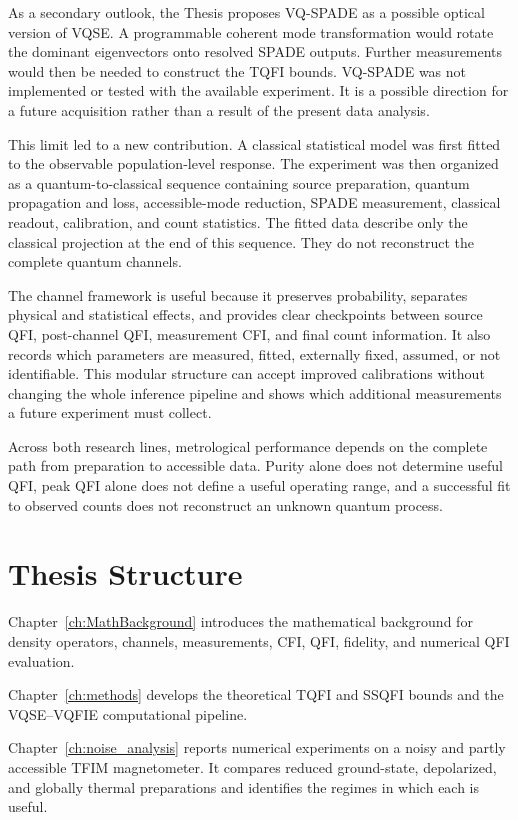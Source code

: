 As a secondary outlook, the Thesis proposes VQ-SPADE as a possible optical version of VQSE.  A programmable coherent mode transformation would rotate the dominant eigenvectors onto resolved SPADE outputs.  Further measurements would then be needed to construct the TQFI bounds.  VQ-SPADE was not implemented or tested with the available experiment.  It is a possible direction for a future acquisition rather than a result of the present data analysis.

This limit led to a new contribution.  A classical statistical model was first fitted to the observable population-level response.  The experiment was then organized as a quantum-to-classical sequence containing source preparation, quantum propagation and loss, accessible-mode reduction, SPADE measurement, classical readout, calibration, and count statistics.  The fitted data describe only the classical projection at the end of this sequence.  They do not reconstruct the complete quantum channels.

The channel framework is useful because it preserves probability, separates physical and statistical effects, and provides clear checkpoints between source QFI, post-channel QFI, measurement CFI, and final count information.  It also records which parameters are measured, fitted, externally fixed, assumed, or not identifiable.  This modular structure can accept improved calibrations without changing the whole inference pipeline and shows which additional measurements a future experiment must collect.

Across both research lines, metrological performance depends on the complete path from preparation to accessible data.  Purity alone does not determine useful QFI, peak QFI alone does not define a useful operating range, and a successful fit to observed counts does not reconstruct an unknown quantum process.

\section{Thesis Structure}

Chapter~\ref{ch:MathBackground} introduces the mathematical background for density operators, channels, measurements, CFI, QFI, fidelity, and numerical QFI evaluation.

Chapter~\ref{ch:methods} develops the theoretical TQFI and SSQFI bounds and the VQSE--VQFIE computational pipeline.

Chapter~\ref{ch:noise_analysis} reports numerical experiments on a noisy and partly accessible TFIM magnetometer.  It compares reduced ground-state, depolarized, and globally thermal preparations and identifies the regimes in which each is useful.

